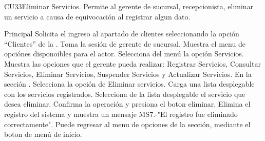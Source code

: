 



	\begin{UseCase}{CU33}{Eliminar Servicios.}{
		Permite al gerente de sucursal, recepcionista, eliminar un servicio a causa de equivocación al registrar algun dato.
	}
	\end{UseCase}

	\begin{UCtrayectoria}{Principal}
		\UCpaso[\UCactor] Solicita el ingreso al apartado de clientes seleccionando la opción ``Clientes'' de la .
		\UCpaso Toma la sesión de gerente de sucursal.
		\UCpaso Muestra el menu de opciónes disponoibles para el actor.
		\UCpaso[\UCactor] Selecciona del menú la opción Servicios.
		\UCpaso Muestra las opciones que el gerente pueda realizar: Registrar Servicios, Consultar Servicios, Eliminar Servicios, Suspender Servicios y Actualizar Servicios. En la sección .
		\UCpaso[\UCactor] Selecciona la opción de Eliminar servicios.
		\UCpaso Carga una lista desplegable con los servicios registrados. 
		\UCpaso[\UCactor] Selecciona de la lista desplegable el servicio que desea eliminar.
		\UCpaso[\UCactor] Confirma la operación y presiona el boton eliminar.
		\UCpaso Elimina el registro del sistema y muestra un mensaje MS7.-"El registro fue eliminado correctamente".
		\UCpaso[\UCactor] Puede regresar al menu de opciones de la sección, mediante el boton de menú de inicio.
	\end{UCtrayectoria}


